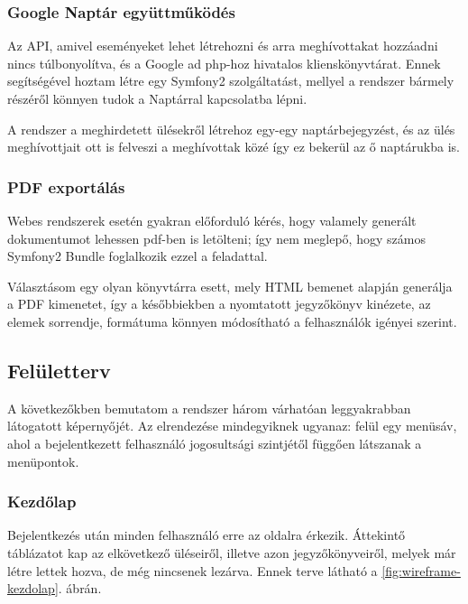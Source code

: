 \documentclass[a4paper,12pt,oneside]{report}
\begin{document}
\subsubsection{Google Naptár együttműködés}

Az API, amivel eseményeket lehet létrehozni és arra meghívottakat hozzáadni\cite{website:gcal_event_api} nincs túlbonyolítva, és a Google ad php-hoz hivatalos klienskönyvtárat\cite{website:google_api_client}. Ennek segítségével hoztam létre egy Symfony2 szolgáltatást, mellyel a rendszer bármely részéről könnyen tudok a Naptárral kapcsolatba lépni.

A rendszer a meghirdetett ülésekről létrehoz egy-egy naptárbejegyzést, és az ülés meghívottjait ott is felveszi a meghívottak közé \textendash{} így ez bekerül az ő naptárukba is.

\subsubsection{PDF exportálás}

Webes rendszerek esetén gyakran előforduló kérés, hogy valamely generált dokumentumot lehessen pdf-ben is letölteni; így nem meglepő, hogy számos Symfony2 Bundle foglalkozik ezzel a feladattal.

Választásom egy olyan könyvtárra esett, mely HTML bemenet alapján generálja a PDF kimenetet, így a későbbiekben a nyomtatott jegyzőkönyv kinézete, az elemek sorrendje, formátuma könnyen módosítható a felhasználók igényei szerint.

\subsection{Felületterv}

A következőkben bemutatom a rendszer három várhatóan leggyakrabban látogatott képernyőjét. Az elrendezése mindegyiknek ugyanaz: felül egy menüsáv, ahol a bejelentkezett felhasználó jogosultsági szintjétől függően látszanak a menüpontok.

\subsubsection{Kezdőlap}

Bejelentkezés után minden felhasználó erre az oldalra érkezik. Áttekintő táblázatot kap az elkövetkező üléseiről, illetve azon jegyzőkönyveiről, melyek már létre lettek hozva, de még nincsenek lezárva. Ennek terve látható a \ref{fig:wireframe-kezdolap}. ábrán.
\end{document}
